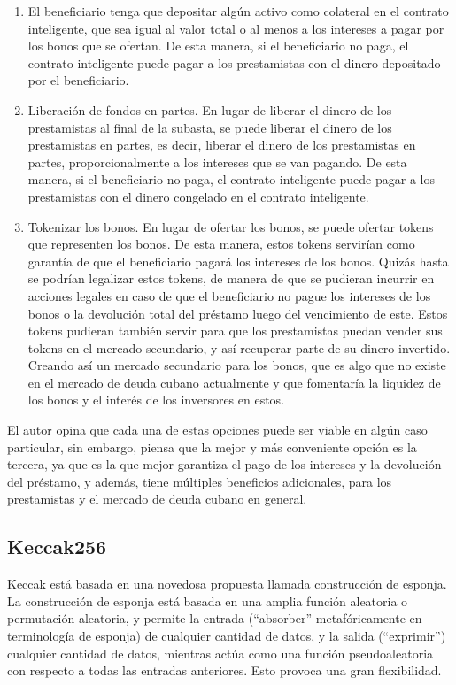       \begin{enumerate}
        \item El beneficiario tenga que depositar algún activo como colateral en el contrato inteligente, que sea igual al valor total o al menos
        a los intereses a pagar por los bonos que
        se ofertan. De esta manera, si el beneficiario no paga, el contrato inteligente puede pagar a los prestamistas con el dinero
        depositado por el beneficiario.
        \item Liberación de fondos en partes. En lugar de liberar el dinero de los prestamistas al final de la subasta, se puede liberar el 
        dinero de los prestamistas en partes, es decir, liberar el dinero de los prestamistas en partes, proporcionalmente a los intereses 
        que se
        van pagando. De esta manera, si el beneficiario no paga, el contrato inteligente puede pagar a los prestamistas con el dinero
        congelado en el contrato inteligente.
        \item Tokenizar los bonos. En lugar de ofertar los bonos, se puede ofertar tokens que representen los bonos. De esta manera, estos
        tokens servirían como garantía de que el beneficiario pagará los intereses de los bonos. Quizás hasta se podrían legalizar estos
        tokens, de manera de que se pudieran incurrir en acciones legales en caso de que el beneficiario no pague los intereses de los
        bonos o la devolución total  del préstamo luego del vencimiento de este. Estos tokens pudieran también servir para que los prestamistas
        puedan vender sus tokens en el mercado secundario, y así recuperar parte de su dinero invertido. Creando así un mercado secundario
        para los bonos, que es algo que no existe en el mercado de deuda cubano actualmente y que fomentaría la liquidez de los bonos y el
        interés de los inversores en estos.
      \end{enumerate}

      El autor opina que cada una de estas opciones puede ser viable en algún caso particular, sin embargo, piensa que la mejor y más 
      conveniente opción 
      es la tercera, ya que es la que mejor garantiza el pago de los intereses y la devolución del préstamo, y además, tiene múltiples
      beneficios adicionales, para los prestamistas y el mercado de deuda cubano en general.

    \subsection{Keccak256}
      Keccak está basada en una novedosa propuesta llamada construcción de esponja. La construcción de esponja está basada en una amplia
      función aleatoria o permutación aleatoria, y permite la entrada (“absorber” metafóricamente en terminología de esponja) de cualquier 
      cantidad de datos,
      y la salida (“exprimir”) cualquier cantidad de datos, mientras actúa como una función pseudoaleatoria con respecto a todas las entradas
      anteriores. Esto provoca una gran flexibilidad. \parencite{bertoni2007}

